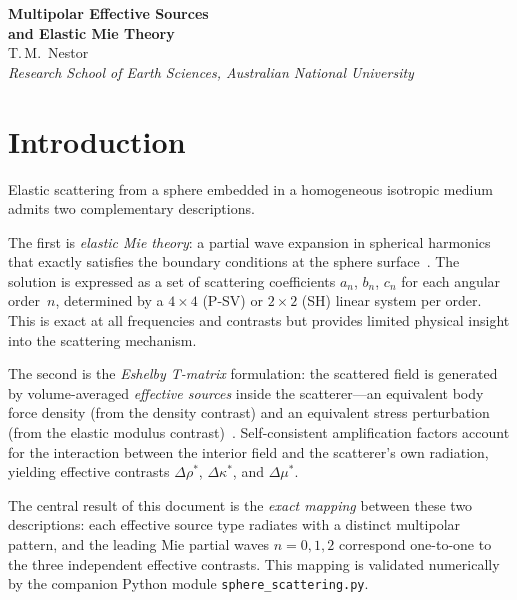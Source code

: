 \documentclass[11pt,a4paper]{article}
\newcommand{\Dmu}{\Delta\mu}
\newcommand{\Drho}{\Delta\rho}
\newcommand{\Dkappa}{\Delta\kappa}
\begin{document}
\thispagestyle{plain}
\begin{center}
\vspace*{1em}
{\LARGE\bfseries Multipolar Effective Sources\\[0.3em]
and Elastic Mie Theory}\\[1.8em]
{\large T.\,M.\ Nestor}\\[0.5em]
{\itshape Research School of Earth Sciences, Australian National University}\\[2em]
\end{center}

\section{Introduction}
\label{sec:intro}

Elastic scattering from a sphere embedded in a homogeneous isotropic
medium admits two complementary descriptions.

The first is \emph{elastic Mie theory}: a partial wave expansion in
spherical harmonics that exactly satisfies the boundary conditions at the
sphere surface~\cite{YingTruell1956,PaoMow1973,EinspruchWitterholtTruell1960}.
The solution is expressed as a set of scattering coefficients $a_n$,
$b_n$, $c_n$ for each angular order~$n$, determined by a $4 \times 4$
(P-SV) or $2 \times 2$ (SH) linear system per order.  This is exact at
all frequencies and contrasts but provides limited physical insight into
the scattering mechanism.

The second is the \emph{Eshelby T-matrix} formulation: the scattered
field is generated by volume-averaged \emph{effective sources} inside
the scatterer---an equivalent body force density (from the density
contrast) and an equivalent stress perturbation (from the elastic
modulus contrast)~\cite{Eshelby1957,GubernatisDomanyKrumhansl1977,
Waterman1969}.  Self-consistent amplification factors account for the
interaction between the interior field and the scatterer's own
radiation, yielding effective contrasts $\Drho^*$, $\Dkappa^*$, and
$\Dmu^*$.

The central result of this document is the \emph{exact mapping} between
these two descriptions: each effective source type radiates with a
distinct multipolar pattern, and the leading Mie partial waves
$n = 0, 1, 2$ correspond one-to-one to the three independent effective
contrasts.  This mapping is validated numerically by the companion
Python module \texttt{sphere\_scattering.py}.
\end{document}
